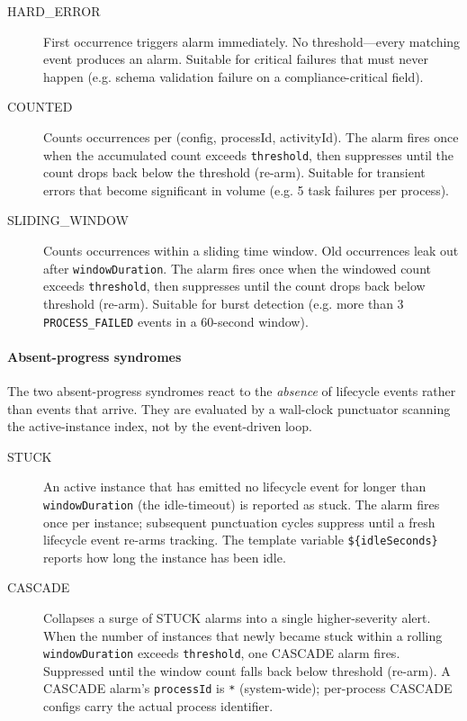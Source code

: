 \begin{description}

\item[HARD\_ERROR] First occurrence triggers alarm immediately. No
threshold---every matching event produces an alarm. Suitable for critical
failures that must never happen (e.g. schema validation failure on a
compliance-critical field).

\item[COUNTED] Counts occurrences per (config, processId, activityId).
The alarm fires once when the accumulated count exceeds
\texttt{threshold}, then suppresses until the count drops back below the
threshold (re-arm). Suitable for transient errors that become significant
in volume (e.g. 5 task failures per process).

\item[SLIDING\_WINDOW] Counts occurrences within a sliding time window.
Old occurrences leak out after \texttt{windowDuration}. The alarm fires
once when the windowed count exceeds \texttt{threshold}, then suppresses
until the count drops back below threshold (re-arm). Suitable for
burst detection (e.g. more than 3 \texttt{PROCESS\_FAILED} events in a
60-second window).

\end{description}

\paragraph{Absent-progress syndromes}

The two absent-progress syndromes react to the \emph{absence} of lifecycle
events rather than events that arrive. They are evaluated by a wall-clock
punctuator scanning the active-instance index, not by the event-driven loop.

\begin{description}

\item[STUCK] An active instance that has emitted no lifecycle event for
longer than \texttt{windowDuration} (the idle-timeout) is reported as stuck.
The alarm fires once per instance; subsequent punctuation cycles suppress
until a fresh lifecycle event re-arms tracking. The template variable
\texttt{\$\{idleSeconds\}} reports how long the instance has been idle.

\item[CASCADE] Collapses a surge of STUCK alarms into a single higher-severity
alert. When the number of instances that newly became stuck within a rolling
\texttt{windowDuration} exceeds \texttt{threshold}, one CASCADE alarm fires.
Suppressed until the window count falls back below threshold (re-arm).
A CASCADE alarm's \texttt{processId} is \texttt{*} (system-wide); per-process
CASCADE configs carry the actual process identifier.

\end{description}

